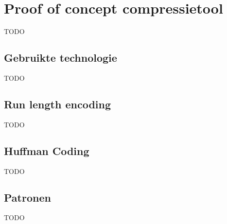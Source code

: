 \chapter{Proof of concept compressietool}
\label{ch:compressietool}

TODO

\section{Gebruikte technologie}
\label{sec:compressietool-gebruikte-technologie}

TODO

\section{Run length encoding}
\label{sec:compressietool-rle}

TODO

\section{Huffman Coding}
\label{sec:compressietool-huffman}

TODO

\section{Patronen}
\label{sec:compressietool-patronen}

TODO
